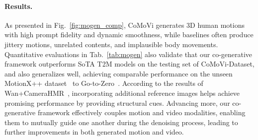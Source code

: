 \paragraph{\bf Results.}
As presented in Fig.~\ref{fig:mogen_comp}, CoMoVi generates 3D human motions with high prompt fidelity and dynamic smoothness, while baselines often produce jittery motions, unrelated contents, and implausible body movements. Quantitative evaluations in Tab.~\ref{tab:mogen} also validate that our co-generative framework outperforms SoTA T2M models on the testing set of CoMoVi-Dataset, and also generalizes well, achieving comparable performance on the unseen MotionX++ dataset~\cite{lin2023motionx} to Go-to-Zero~\cite{fan2025gotozero}. According to the results of Wan+CameraHMR~\cite{wan2025wan,patel2025camerahmr}, incorporating additional reference images helps achieve promising performance by providing structural cues. Advancing more, our co-generative framework effectively couples motion and video modalities, enabling them to mutually guide one another during the denoising process, leading to further improvements in both generated motion and video.

